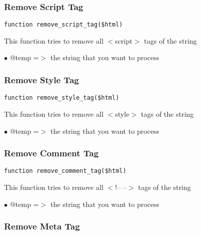 \documentclass[a4paper]{article}
\begin{document}
\subsubsection{Remove Script Tag}

\begin{lstlisting}
function remove_script_tag($html)
\end{lstlisting}

This function tries to remove all $<$script$>$ tags of the string

\begin{compactitem}
\item[\color{myblue}$\bullet$] @temp =$>$ the string that you want to process
\end{compactitem}

\hypertarget{toc110}{}
\subsubsection{Remove Style Tag}

\begin{lstlisting}
function remove_style_tag($html)
\end{lstlisting}

This function tries to remove all $<$style$>$ tags of the string

\begin{compactitem}
\item[\color{myblue}$\bullet$] @temp =$>$ the string that you want to process
\end{compactitem}

\hypertarget{toc111}{}
\subsubsection{Remove Comment Tag}

\begin{lstlisting}
function remove_comment_tag($html)
\end{lstlisting}

This function tries to remove all $<$!-- --$>$ tags of the string

\begin{compactitem}
\item[\color{myblue}$\bullet$] @temp =$>$ the string that you want to process
\end{compactitem}

\hypertarget{toc112}{}
\subsubsection{Remove Meta Tag}
\end{document}
